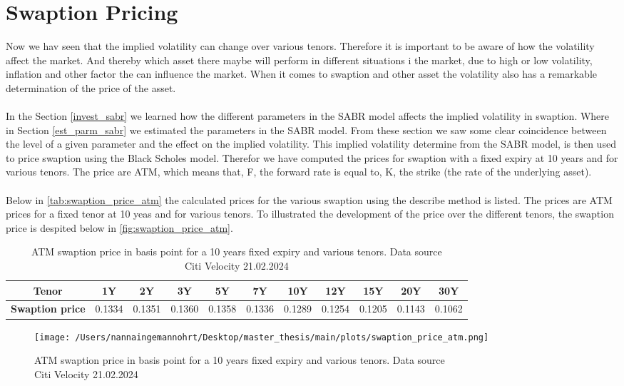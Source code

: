 \section{Swaption Pricing} \label{swaption_price_sec}
Now we hav seen that the implied volatility can change over various tenors. 
Therefore it is important to be aware of how the volatility affect the market.
And thereby which asset there maybe will perform in different situations i the market,
due to high or low volatility, inflation and other factor the can influence the market.
When it comes to swaption and other asset the volatility also has
a remarkable determination of the price of the asset. 
\\\\
In the Section \ref{invest_sabr} we learned how the different parameters in the 
SABR model affects the implied volatility in swaption. 
Where in Section \ref{est_parm_sabr} we estimated the parameters in the SABR model. 
From these section we saw some clear coincidence between the level of a given parameter
and the effect on the implied volatility. 
This implied volatility determine from the SABR model, is then used to price swaption using the 
Black Scholes model. 
Therefor we have computed the prices for swaption with a fixed expiry at 10 years and for various tenors. 
The price are ATM, which means that, F, the forward rate is equal to, K, 
the strike (the rate of the underlying asset). 
\\\\
Below in \autoref{tab:swaption_price_atm} the calculated prices for the various swaption 
using the describe method is listed. 
The prices are ATM prices for a fixed tenor at 10 yeas and for various tenors. 
To illustrated the development of the price over the different tenors, 
the swaption price is despited below in  \autoref{fig:swaption_price_atm}.
\\
\begin{table}[H]
  \centering
  \begin{tabular}{ccccccccccc}
    \toprule
    \textbf{ Tenor} & 1Y & 2Y & 3Y & 5Y & 7Y & 10Y & 12Y & 15Y & 20Y & 30Y \\
    \midrule
    \textbf{ Swaption price }&0.1334 & 0.1351 & 0.1360 &0.1358  &0.1336  &0.1289
    &0.1254& 0.1205 & 0.1143 & 0.1062 \\
    \bottomrule
  \end{tabular}
  \caption{ATM swaption price in basis point for a 10 years fixed expiry and various tenors.
  Data source  \\ Citi Velocity 21.02.2024}
  \label{tab:swaption_price_atm}
\end{table}

\begin{figure}[H]
    \centering
    \texttt{[image: /Users/nannaingemannohrt/Desktop/master\_thesis/main/plots/swaption\_price\_atm.png]}
    \caption{ATM swaption price in basis point for a 10 years fixed expiry and various tenors.
    Data source  \\ Citi Velocity 21.02.2024}
    \label{fig:swaption_price_atm}
\end{figure}
\noindent